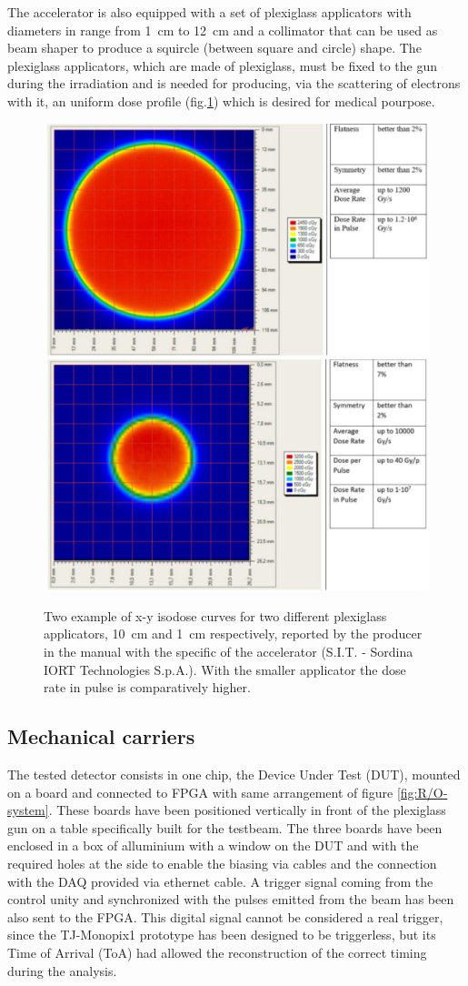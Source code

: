       The accelerator is also equipped with a set of plexiglass applicators with diameters in range from \SI{1}{cm} to \SI{12}{cm} and a collimator that can be used as beam shaper to produce a squircle (between square and circle) shape.
      The plexiglass applicators, which are made of plexiglass, must be fixed to the gun during the irradiation and is needed for producing,  via the scattering of electrons with it, an uniform dose profile (fig.\ref{fig:dose_profile}) which is desired for medical pourpose.
      \begin{figure}[h!]
         \centering
         \includegraphics[width=.49\linewidth]{figures/test_beam/dose_profile_10cm.pdf}
         \includegraphics[width=.49\linewidth]{figures/test_beam/dose_profile_1cm.pdf}
         \caption{Two example of x-y isodose curves for two different plexiglass applicators, \SI{10}{cm} and \SI{1}{cm} respectively, reported by the producer in the manual with the specific of the accelerator (S.I.T. - Sordina IORT Technologies S.p.A.). With the smaller applicator the dose rate in pulse is comparatively higher.}
         \label{fig:dose_profile}
      \end{figure}  

   \subsection{Mechanical carriers} 
      The tested detector consists in one chip, the Device Under Test (DUT), mounted on a board and connected to FPGA with same arrangement of figure \ref{fig:R/O-system}.
      These boards have been positioned vertically in front of the plexiglass gun on a table specifically built for the testbeam. The three boards have been enclosed in a box of alluminium with a window on the DUT and with the required holes at the side to enable the biasing via cables and the connection with the DAQ provided via ethernet cable.       
      A trigger signal coming from the control unity and synchronized with the pulses emitted from the beam has been also sent to the FPGA.
      This digital signal cannot be considered a real trigger, since the TJ-Monopix1 prototype has been designed to be triggerless, but its Time of Arrival (ToA) had allowed the reconstruction of the correct timing during the analysis.

